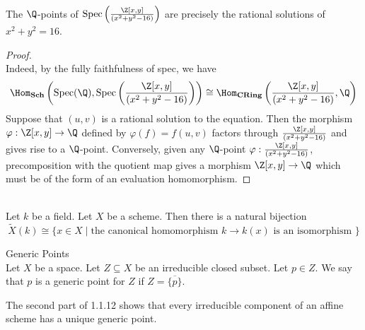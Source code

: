 \documentclass[a4paper]{article}
\begin{document}
\begin{eg}{}{}\\
The $\Q$-points of $\text{Spec}\left(\frac{\Z[x,y]}{(x^2+y^2-16)}\right)$ are precisely the rational solutions of $x^2+y^2=16$. 
\begin{proof}\\
Indeed, by the fully faithfulness of spec, we have $$\Hom_{\bold{Sch}}\left(\text{Spec}(\Q),\text{Spec}\left(\frac{\Z[x,y]}{(x^2+y^2-16)}\right)\right)\cong\Hom_{\bold{CRing}}\left(\frac{\Z[x,y]}{(x^2+y^2-16)},\Q\right)$$ Suppose that $(u,v)$ is a rational solution to the equation. Then the morphism $\varphi:\Z[x,y]\to\Q$ defined by $\varphi(f)=f(u,v)$ factors through $\frac{\Z[x,y]}{(x^2+y^2-16)}$ and gives rise to a $\Q$-point. Conversely, given any $\Q$-point $\varphi:\frac{\Z[x,y]}{(x^2+y^2-16)}$, precomposition with the quotient map gives a morphism $\Z[x,y]\to\Q$ which must be of the form of an evaluation homomorphism. 
\end{proof}
\end{eg}

\begin{prp}{}{}\\
Let $k$ be a field. Let $X$ be a scheme. Then there is a natural bijection $$\widetilde{X}(k)\cong\{x\in X\;|\;\text{the canonical homomorphism }k\to k(x)\text{ is an isomorphism }\}$$
\end{prp}

\begin{defn}{Generic Points}{}\\
Let $X$ be a space. Let $Z\subseteq X$ be an irreducible closed subset. Let $p\in Z$. We say that $p$ is a generic point for $Z$ if $Z=\overline{\{p\}}$. 
\end{defn}

The second part of 1.1.12 shows that every irreducible component of an affine scheme has a unique generic point. 
\end{document}
